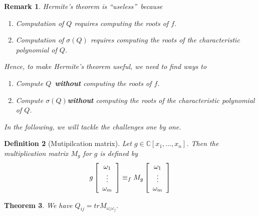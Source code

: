 \documentclass{article}%
\newtheorem{theorem}{Theorem}
\newtheorem{definition}[theorem]{Definition}
\newtheorem{remark}[theorem]{Remark}
\begin{document}
\begin{remark}
Hermite's theorem is \textquotedblleft useless\textquotedblright\ because

\begin{enumerate}
\item Computation of $Q$ requires computing the roots of $f$.

\item Computation of $\sigma\left(  Q\right)$ requires computing the roots
of the characteristic polynomial of $Q$.
\end{enumerate}

\noindent Hence, to make Hermite's theorem useful, we need to find ways to

\begin{enumerate}
\item Compute $Q$\ \textbf{without} computing the roots of $f$.

\item Compute $\sigma\left(  Q\right)$\textbf{without} 
computing the roots of the characteristic polynomial of $Q$.
\end{enumerate}

\noindent In the following, we will tackle the challenges one by one.
\end{remark}

\begin{definition}
[Mutipilcation matrix]Let $g\in\mathbb{C}\left[  x_{1},\ldots,x_{n}\right]  $.
Then the multiplication matrix $M_{g}$ for $g$ is defined by%
\[
g\left[
\begin{array}
[c]{c}%
\omega_{1}\\
\vdots\\
\omega_{m}%
\end{array}
\right]  \equiv_{f}M_{g}\left[
\begin{array}
[c]{c}%
\omega_{1}\\
\vdots\\
\omega_{m}%
\end{array}
\right]
\]
\end{definition}

\begin{theorem}
We have $Q_{ij}=trM_{\omega_{i}\omega_{j}}$.
\end{theorem}
\end{document}
